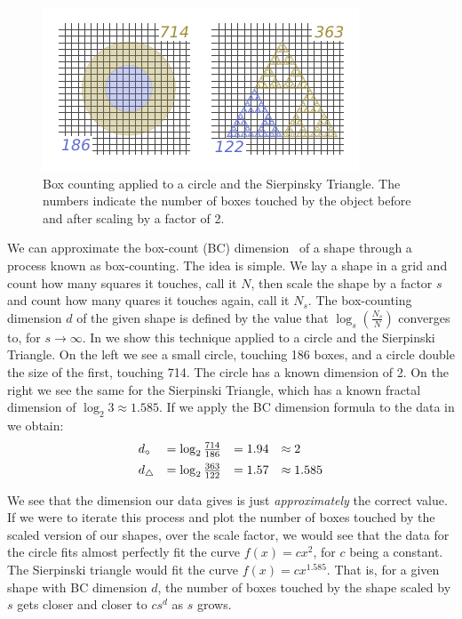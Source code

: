 
\begin{figure}
  \includegraphics[width=\linewidth]{src/img/box-counting-example-alt.pdf}
  \caption{Box counting applied to a circle and the Sierpinsky Triangle. The numbers
indicate the number of boxes touched by the object before and after scaling by a factor of 2.}
  \label{fig:egboxcount}
\end{figure}

  We can approximate the box-count (BC) dimension~\cite{findref} of a
shape through a process known as box-counting. The idea is simple. We
lay a shape in a grid and count how many squares it touches, call it
$N$, then scale the shape by a factor $s$ and count how many quares it
touches again, call it $N_s$. The box-counting dimension $d$ of the
given shape is defined by the value that $\log_s(\frac{N_s}{N})$
converges to, for $s \rightarrow \infty$.  In  we
show this technique applied to a circle and the Sierpinski
Triangle. On the left we see a small circle, touching 186 boxes, and a
circle double the size of the first, touching 714.  The circle has a
known dimension of 2. On the right we see the same for the Sierpinski
Triangle, which has a known fractal dimension of $\log_2 3 \approx 1.585$.
If we apply the BC dimension formula to the data in  we obtain:
\[
\begin{array}{l l l l}
  d_{\circ}    &= \log_2{\frac{714}{186}} &= 1.94 &\approx 2 \\[.5em]
  d_{\tiny \triangle} &= \log_2{\frac{363}{122}} &= 1.57 &\approx 1.585 \\
\end{array}
\]

  We see that the dimension our data gives is just
\emph{approximately} the correct value. If we were to iterate this
process and plot the number of boxes touched by the scaled version of
our shapes, over the scale factor, we would see that the data for the
circle fits almost perfectly fit the curve $f(x) = cx^2$, for $c$
being a constant. The Sierpinski triangle would fit the curve $f(x) =
cx^{1.585}$.  That is, for a given shape with BC dimension $d$, the
number of boxes touched by the shape scaled by $s$ gets closer and
closer to $cs^d$ as $s$ grows.

